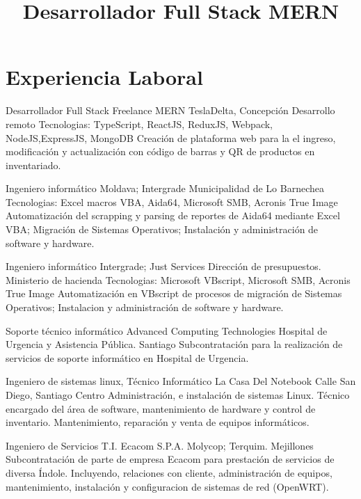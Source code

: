 \documentclass[draft,color,12pt,letterpaper,sans]{moderncv}
\title{Desarrollador Full Stack MERN}
\begin{document}
\makecvtitle %

\section{Experiencia Laboral}
{Desarrollador Full Stack Freelance MERN}
{TeslaDelta, Concepci\'on}
{\newline Desarrollo remoto}
{\newline Tecnologias: TypeScript, ReactJS, ReduxJS, Webpack, NodeJS,ExpressJS, MongoDB}
{Creaci\'on de plataforma web para la el ingreso, modificaci\'on y actualizaci\'on con c\'odigo de barras y QR de productos en inventariado.\newline}

{Ingeniero inform\'atico}
{Moldava; Intergrade}
{Municipalidad de Lo Barnechea}
{\newline Tecnologias: Excel macros VBA, Aida64, Microsoft SMB, Acronis True Image}
{Automatizaci\'on del scrapping y parsing de reportes de Aida64 mediante Excel VBA; Migraci\'on de Sistemas Operativos; Instalaci\'on y administraci\'on de software y hardware.\newline}


{Ingeniero inform\'atico}
{Intergrade; Just Services}
{Direcci\'on de presupuestos. Ministerio de hacienda}
{\newline Tecnologias: Microsoft VBscript, Microsoft SMB, Acronis True Image}
{Automatizaci\'on en VBscript de procesos de migraci\'on de Sistemas Operativos; Instalacion y administraci\'on de software y hardware.\newline}

{Soporte t\'ecnico inform\'atico}
{Advanced Computing Technologies}
{Hospital de Urgencia y Asistencia P\'ublica. Santiago}
{}
{Subcontrataci\'on para la realizaci\'on de servicios de soporte inform\'atico en Hospital de Urgencia.\newline}

{Ingeniero de sistemas linux, T\'ecnico Inform\'atico}
{La Casa Del Notebook}
{Calle San Diego, Santiago Centro}
{}
{Administraci\'on, e instalaci\'on de sistemas Linux. T\'ecnico encargado del \'area de software, mantenimiento de hardware y control de inventario. Mantenimiento, reparaci\'on y venta de equipos inform\'aticos.\newline} 

{Ingeniero de Servicios T.I.}
{Ecacom S.P.A.}
{Molycop; Terquim. Mejillones}
{}
{Subcontrataci\'on de parte de empresa Ecacom para prestaci\'on de servicios de diversa \'Indole. Incluyendo, relaciones con cliente, administraci\'on de equipos, mantenimiento, instalaci\'on y configuracion de sistemas de red (OpenWRT).\newline}
\end{document}
